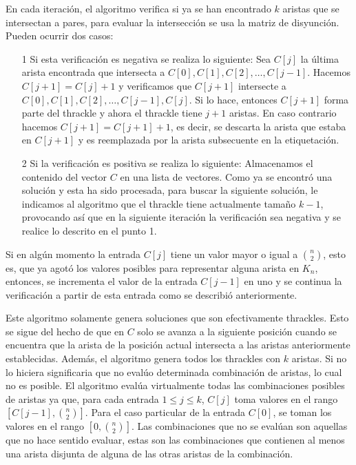   En cada iteración, el algoritmo verifica si ya se han encontrado $k$ aristas
  que se intersectan a pares, para evaluar la intersección se usa la matriz de
  disyunción. Pueden ocurrir dos casos:
  \begin{itemize}
    \item[1] Si esta verificación es negativa se realiza lo siguiente:
    Sea $C[j]$ la última arista encontrada que intersecta a $C[0],C[1],C[2],\dots,C[j-1]$. Hacemos $C[j+1]=C[j]+1$ y verificamos que $C[j+1]$ intersecte a $C[0],C[1],C[2],\dots,C[j-1],C[j]$.
    Si lo hace, entonces $C[j+1]$ forma parte del thrackle y ahora el thrackle tiene $j+1$ aristas. En caso contrario hacemos $C[j+1]=C[j+1]+1$, es decir, se descarta la arista que estaba en $C[j+1]$ y es reemplazada por la arista subsecuente en la etiquetación.
    \item[2] Si la verificación es positiva se realiza lo siguiente:
    Almacenamos el contenido del vector $C$ en una lista de vectores.
    Como ya se encontró una solución y esta ha sido procesada, para buscar la siguiente solución, le indicamos al algoritmo que el thrackle tiene actualmente tamaño $k-1$, provocando así que en la siguiente iteración la verificación sea negativa y se realice lo descrito en el punto 1.
  \end{itemize}
  Si en algún momento la entrada $C[j]$ tiene un valor mayor o igual a
  $\binom{n}{2}$, esto es, que ya agotó los valores posibles para representar
  alguna arista en $K_n$, entonces, se incrementa el valor de la entrada $C[j-1]$ en uno y se continua la verificación a partir de esta entrada como se describió anteriormente.

  Este algoritmo solamente genera soluciones que son efectivamente thrackles.
  Esto se sigue del hecho de que en $C$ solo se avanza a la siguiente posición
  cuando se encuentra que la arista de la posición actual intersecta a las
  aristas anteriormente establecidas. Además, el algoritmo genera todos los
  thrackles con $k$ aristas. Si no lo hiciera significaria que no evalúo
  determinada combinación de aristas, lo cual no es posible. El algoritmo
  evalúa virtualmente todas las combinaciones posibles de aristas ya que, para
  cada entrada $1\leq j\leq k$, $C[j]$ toma valores en el rango
  $\left[C[j-1],\binom{n}{2}\right]$. Para el caso particular de la entrada
  $C[0]$, se toman los valores en el rango $\left[ 0, \binom{n}{2}\right]$. Las
  combinaciones que no se evalúan son aquellas que no hace sentido evaluar,
  estas son las combinaciones que contienen al menos una arista disjunta de
  alguna de las otras aristas de la combinación.


